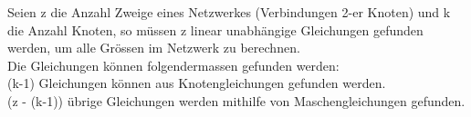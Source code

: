 					          \beginip
					             Seien z die Anzahl Zweige eines Netzwerkes (Verbindungen 2-er Knoten) und k die Anzahl Knoten, so müssen z linear unabhängige Gleichungen gefunden werden, um alle Grössen im Netzwerk zu berechnen.  \\Die Gleichungen können folgendermassen gefunden werden: \\
					             \formulaBegin
					              (k-1) Gleichungen können aus Knotengleichungen gefunden werden. \\
					              (z - (k-1)) übrige Gleichungen werden mithilfe von Maschengleichungen gefunden.
					             \formulaEnd
					           \iend



					           \beginip
